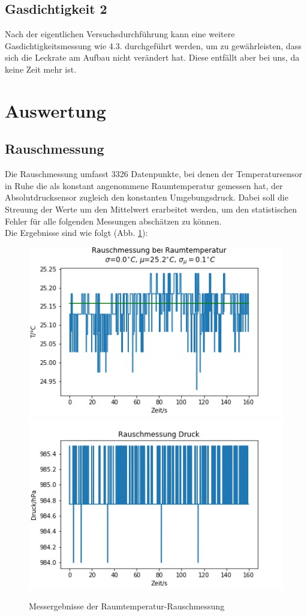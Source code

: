 \documentclass[]{article}
\begin{document}
	\subsection{Gasdichtigkeit 2}
	
	Nach der eigentlichen Versuchsdurchführung kann eine weitere Gasdichtigkeitsmessung wie 4.3. durchgeführt werden, um zu gewährleisten, dass sich die Leckrate am Aufbau nicht verändert hat. Diese entfällt aber bei uns, da keine Zeit mehr ist.
	
	\section{Auswertung}
	\subsection{Rauschmessung}
	Die Rauschmessung umfasst 3326 Datenpunkte, bei denen der Temperatursensor in Ruhe die als konstant angenommene Raumtemperatur gemessen hat, der Absolutdrucksensor zugleich den konstanten Umgebungsdruck. Dabei soll die Streuung der Werte um den Mittelwert erarbeitet werden, um den statistischen Fehler für alle folgenden Messungen abschätzen zu können.\\
	Die Ergebnisse sind wie folgt (Abb. \ref{RM_T_p}):\\
	\begin{figure}[h]
		\begin{center}
			\includegraphics[scale=0.45]{Images/RauschmessungRT_T.jpg}
			\includegraphics[scale=0.45]{Images/RauschmessungRT_p.jpg}
			\caption{Messergebnisse der Raumtemperatur-Rauschmessung}
			\label{RM_T_p}
		\end{center}
	\end{figure}\\
\end{document}
